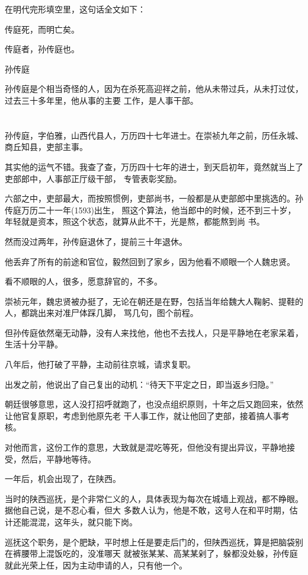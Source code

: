 \documentclass[11pt,a4paper,onecolumn]{article}
\begin{document}
在明代完形填空里，这句话全文如下：

传庭死，而明亡矣。

传庭者，孙传庭也。

孙传庭

孙传庭是个相当奇怪的人，因为在杀死高迎祥之前，他从未带过兵，从未打过仗，过去三十多年里，他从事的主要
工作，是人事干部。

\section[\thesection]{}

孙传庭，字伯雅，山西代县人，万历四十七年进士。在崇祯九年之前，历任永城、商丘知县，吏部主事。

其实他的运气不错。我查了查，万历四十七年的进士，到天启初年，竟然就当上了吏部郎中，人事部正厅级干部，
专管表彰奖励。

六部之中，吏部最大，而按照惯例，吏部尚书，一般都是从吏部郎中里挑选的。孙传庭万历二十一年(1593)出生，
照这个算法，他当郎中的时候，还不到三十岁，年轻就是资本，照这个状态，就算从此不干，光是熬，都能熬到尚
书。

然而没过两年，孙传庭退休了，提前三十年退休。

他丢弃了所有的前途和官位，毅然回到了家乡，因为他看不顺眼一个人\myrule 魏忠贤。

看不顺眼的人，很多，愿意辞官的，不多。

崇祯元年，魏忠贤被办挺了，无论在朝还是在野，包括当年给魏大人鞠躬、提鞋的人，都跳出来对准尸体踩几脚，
骂几句，图个前程。

但孙传庭依然毫无动静，没有人来找他，他也不去找人，只是平静地在老家呆着，生活十分平静。

八年后，他打破了平静，主动前往京城，请求复职。

出发之前，他说出了自己复出的动机：``待天下平定之日，即当返乡归隐。''

朝廷很够意思，这人没打招呼就跑了，也没点组织原则，十年之后又跑回来，依然让他官复原职，考虑到他原先老
干人事工作，就让他回了吏部，接着搞人事考核。

对他而言，这份工作的意思，大致就是混吃等死，但他没有提出异议，平静地接受，然后，平静地等待。

一年后，机会出现了，在陕西。

当时的陕西巡抚，是个非常仁义的人，具体表现为每次在城墙上观战，都不睁眼。据他自己说，是不忍心看，但大
多数人认为，他是不敢，这号人在和平时期，估计还能混混，这年头，就只能下岗。

巡抚这个职务，是个肥缺，平时想上任是要走后门的，但陕西巡抚，算是把脑袋别在裤腰带上混饭吃的，没准哪天
就被张某某、高某某剁了，躲都没处躲，孙传庭就此光荣上任，因为主动申请的人，只有他一个。
\end{document}
